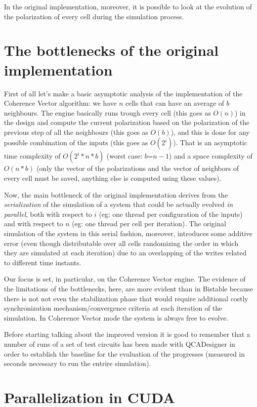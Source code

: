In the original implementation, moreover, it is possible to look at the evolution of the polarization of every cell during the simulation process.
\section {The bottlenecks of the original implementation}
First of all let's make a basic asymptotic analysis of the implementation of the Coherence Vector algorithm: we have $n$ cells that can have an average of $b$ neighbours. The engine basically runs trough every cell (this goes as $O(n)$) in the design and compute the current polarization based on the polarization of the previous step of all the neighbours (this goes as $O(b)$), and this is done for any possible combination of the inputs (this goes as $O(2^i)$). That is an asymptotic time complexity of $O(2^i*n*b)$  (worst case: $b$=$n-1$) and a space complexity of $O(n*b)$ (only the vector of the polarizations and the vector of neighbors of every cell must be saved, anything else is computed using these values).

Now, the main bottleneck of the original implementation derives from the \textsl{serialization} of the simulation of a system that could be actually evolved \textsl{in parallel}, both with respect to $i$ (eg: one thread per configuration of the inputs) and with respect to $n$ (eg: one thread per cell per iteration). The original simulation of the system in this serial fashion, moreover, introduces some additive error (even though distributable over all cells randomizing the order in which they are simulated at each iteration) due to an overlapping of the writes related to different time instants. 

Our focus is set, in particular, on the Coherence Vector engine. The evidence of the limitations of the bottlenecks, here, are more evident than in Bistable because there is not not even the stabilization phase that would require additional costly synchronization mechanism/convergence criteria at each iteration of the simulation. In Coherence Vector mode the system is always free to evolve.

Before starting talking about the improved version it is good to remember that a number of runs of a set of test circuits has been made with QCADesigner in order to establish the baseline for the evaluation of the progresses (measured in seconds necessary to run the entrire simulation).
\section {Parallelization in CUDA}
